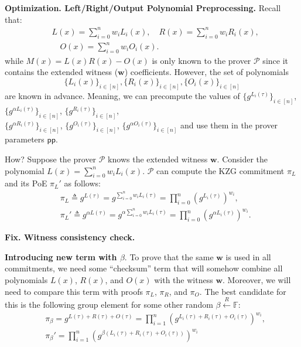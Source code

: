 \documentclass[../lecture-notes.tex]{subfiles}
\begin{document}
\textcolor{blue!75!gray}{\textbf{Optimization. Left/Right/Output Polynomial Preprocessing.}} Recall that:
\begin{equation*}
    \begin{aligned}
        &L(x) = \sum_{i=0}^n w_iL_i(x), \quad R(x) = \sum_{i=0}^n w_i R_i(x), \\ &\quad O(x) = \sum_{i=0}^n w_iO_i(x).        
    \end{aligned}
\end{equation*}
while $M(x) = L(x)R(x) - O(x)$ is only known to the prover $\mathcal{P}$ since it contains the extended witness ($\mathbf{w}$) coefficients. However, the set of polynomials
\begin{equation*}
    \{L_i(x)\}_{i \in [n]}, \{R_i(x)\}_{i \in [n]}, \{O_i(x)\}_{i \in [n]}
\end{equation*}
are known in advance. Meaning, we can precompute the values of $\{g^{L_i(\tau)}\}_{i \in [n]}$, $\{g^{\alpha L_i(\tau)}\}_{i \in [n]}$, $\{g^{R_i(\tau)}\}_{i \in [n]}$, \\ $\{g^{\alpha R_i(\tau)}\}_{i \in [n]}$, $\{g^{O_i(\tau)}\}_{i \in [n]}$, $\{g^{\alpha O_i(\tau)}\}_{i \in [n]}$ and use them in the prover parameters $\mathsf{pp}$.

How? Suppose the prover $\mathcal{P}$ knows the extended witness $\mathbf{w}$. Consider the polynomial $L(x) = \sum_{i=0}^n w_iL_i(x)$. $\mathcal{P}$ can compute the KZG commitment $\pi_L$ and its PoE $\pi_L'$ as follows:
\begin{equation*}
    \begin{aligned}
        &\pi_L \triangleq g^{L(\tau)} = g^{\sum_{i=0}^n w_iL_i(\tau)} = \prod_{i=0}^n (g^{L_i(\tau)})^{w_i}, \quad \\ &\pi_L' \triangleq g^{\alpha L(\tau)} = g^{\alpha \sum_{i=0}^n w_iL_i(\tau)} = \prod_{i=0}^n (g^{\alpha L_i(\tau)})^{w_i}.        
    \end{aligned}
\end{equation*}

\textcolor{green!50!black}{\textbf{Fix. Witness consistency check.}} 

\textbf{Introducing new term with $\beta$}. To prove that the same $\mathbf{w}$ is used in all commitments, we need some ``checksum'' term that will somehow combine all polynomials $L(x)$, $R(x)$, and $O(x)$ with the witness $\mathbf{w}$. Moreover, we will need to compare this term with proofs $\pi_L$, $\pi_R$, and $\pi_O$. The best candidate for this is the following group element for some other random $\beta \xleftarrow{R} \mathbb{F}$:
\begin{equation*}
    \begin{aligned}
        &\pi_{\beta} = g^{L(\tau) + R(\tau) + O(\tau)} = \prod_{i=1}^n (g^{L_i(\tau) + R_i(\tau) + O_i(\tau)})^{w_i}, \\ &\pi_{\beta}' = \prod_{i=1}^n (g^{\beta(L_i(\tau) + R_i(\tau) + O_i(\tau))})^{w_i}        
    \end{aligned}
\end{equation*}
\end{document}

